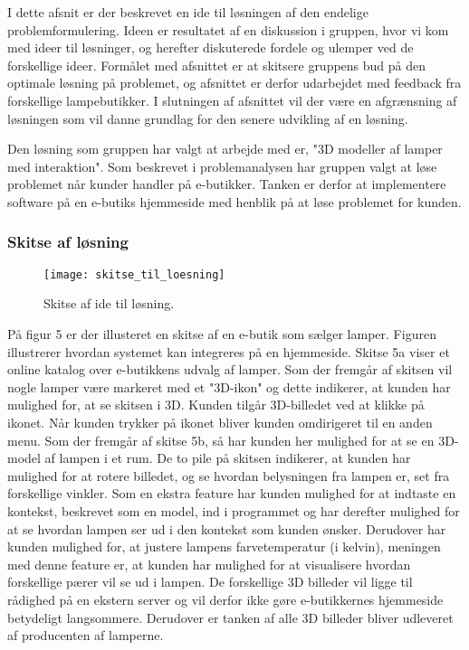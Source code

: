 
I dette afsnit er der beskrevet en ide til løsningen af den endelige problemformulering. Ideen er resultatet af en diskussion i gruppen, hvor vi kom med ideer til løsninger, og herefter diskuterede fordele og ulemper ved de forskellige ideer. Formålet med afsnittet er at skitsere gruppens bud på den optimale løsning på problemet, og afsnittet er derfor udarbejdet med feedback fra forskellige lampebutikker. I slutningen af afsnittet vil der være en afgrænsning af løsningen som vil danne grundlag for den senere udvikling af en løsning.

Den løsning som gruppen har valgt at arbejde med er, "3D modeller af lamper med interaktion". Som beskrevet i problemanalysen har gruppen valgt at løse problemet når kunder handler på e-butikker. Tanken er derfor at implementere software på en e-butiks hjemmeside med henblik på at løse problemet for kunden.

\subsubsection{Skitse af løsning}

\begin{figure}[H]
   \centering
   \texttt{[image: skitse\_til\_loesning]}
   \caption{Skitse af ide til løsning.}
\end{figure}

På figur 5 er der illusteret en skitse af en e-butik som sælger lamper. Figuren illustrerer hvordan systemet kan integreres på en hjemmeside. Skitse 5a viser et online katalog over e-butikkens udvalg af lamper. Som der fremgår af skitsen vil nogle lamper være markeret med et "3D-ikon" og dette indikerer, at kunden har mulighed for, at se skitsen i 3D. Kunden tilgår 3D-billedet ved at klikke på ikonet. Når kunden trykker på ikonet bliver kunden omdirigeret til en anden menu. Som der fremgår af skitse 5b, så har kunden her mulighed for at se en 3D-model af lampen i et rum. De to pile på skitsen indikerer, at kunden har mulighed for at rotere billedet, og se hvordan belysningen fra lampen er, set fra forskellige vinkler. Som en ekstra feature har kunden mulighed for at indtaste en kontekst, beskrevet som en model, ind i programmet og har derefter mulighed for at se hvordan lampen ser ud i den kontekst som kunden ønsker. 
Derudover har kunden mulighed for, at justere lampens farvetemperatur (i kelvin), meningen med denne feature er, at kunden har mulighed for at visualisere hvordan forskellige pærer vil se ud i lampen. De forskellige 3D billeder vil ligge til rådighed på en ekstern server og vil derfor ikke gøre e-butikkernes hjemmeside betydeligt langsommere. Derudover er tanken af alle 3D billeder bliver udleveret af producenten af lamperne. 

